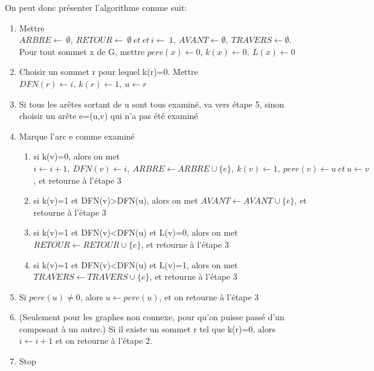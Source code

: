 On peut donc présenter l'algorithme comme suit:
\begin{enumerate}
	\item Mettre  $ARBRE \leftarrow\ \emptyset,\ RETOUR \leftarrow\ \emptyset\ et\ et\ i\leftarrow\ 1,\ AVANT\gets\emptyset,\ TRAVERS\gets\emptyset$. Pour tout sommet x de G, mettre $pere(x)\leftarrow 0$, $k(x)\leftarrow 0,\ L(x)\gets0$
	\item Choisir un sommet r pour lequel k(r)=0. Mettre  $DFN(r) \gets i,\ k(r) \gets 1,\ u \gets r$
	\item Si tous les arêtes sortant de u sont tous examiné, va vers étape 5, sinon  choisir un arête e=(u,v) qui n'a pas été examiné
	\item Marque l'arc e comme examiné
	\begin{enumerate}
		\item si k(v)=0, alors on met $i \gets i+1,\ DFN(v)\gets i,\ ARBRE\gets ARBRE \cup\{e\},\ k(v)\gets 1,\ pere(v)\gets u\ et\ u\gets v$, et retourne à l'étape 3
		\item si k(v)=1 et DFN(v)>DFN(u), alors on met $AVANT\gets AVANT\cup\{e\}$, et retourne à l'étape 3
		\item si k(v)=1 et DFN(v)<DFN(u) et L(v)=0, alors on met $RETOUR\gets RETOUR\cup\{e\}$, et retourne à l'étape 3
		\item si k(v)=1 et DFN(v)<DFN(u) et L(v)=1, alors on met $TRAVERS\gets TRAVERS\cup\{e\}$, et retourne à l'étape 3
	\end{enumerate}  
	\item Si $pere(u)\neq 0$, alors $u\gets pere(u)$, et on retourne à l'étape 3
	\item (Seulement pour les graphes non connexe, pour qu'on puisse passé d'un composant à un autre.) Si il existe un sommet r tel que k(r)=0, alors $i\gets i+1$ et on retourne à l'étape 2.
	\item Stop
\end{enumerate}


